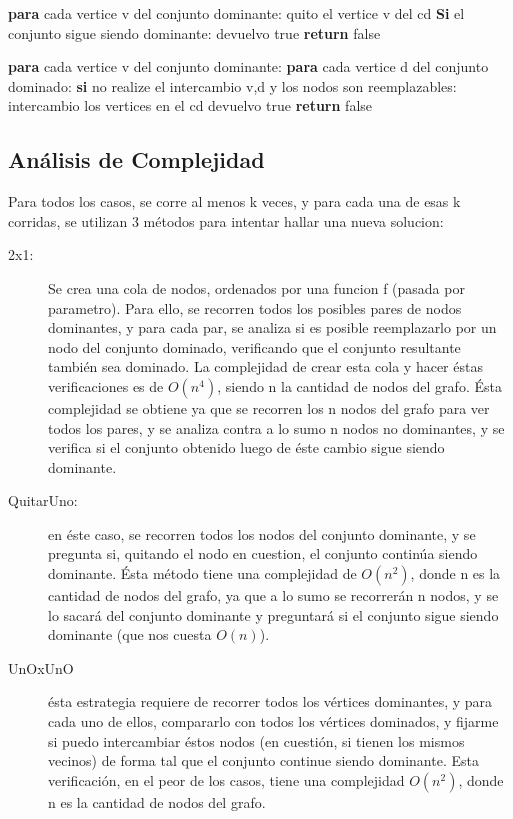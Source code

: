 \begin{codebox}
\li		\textbf{para} cada vertice v del conjunto dominante: \Do
\li			quito el vertice v del cd
\li			\textbf{Si} el conjunto sigue siendo dominante: \Do
\li				devuelvo true
\End
\End
\li \textbf{return} false
\end{codebox}

\begin{codebox}
\li		\textbf{para} cada vertice v del conjunto dominante: \Do
\li			\textbf{para} cada vertice d del conjunto dominado: \Do
\li				\textbf{si} no realize el intercambio v,d y los nodos son reemplazables: \Do
\li					intercambio los vertices en el cd
\li					devuelvo true
\End
\End
\End
\li \textbf{return} false
\end{codebox}

\subsection{Análisis de Complejidad}
Para todos los casos, se corre al menos k veces, y para cada una de esas k corridas, se utilizan 3 métodos para intentar hallar una nueva solucion:
\begin{description}
\item[2x1:] Se crea una cola de nodos, ordenados por una funcion f (pasada por parametro). Para ello, se recorren todos los posibles pares de nodos dominantes, y para cada par, se analiza si es posible reemplazarlo por un nodo del conjunto dominado, verificando que el conjunto resultante también sea dominado. La complejidad de crear esta cola y hacer éstas verificaciones es de $O(n^4)$, siendo n la cantidad de nodos del grafo. Ésta complejidad se obtiene ya que se recorren los n nodos del grafo para ver todos los pares, y se analiza contra a lo sumo n nodos no dominantes, y se verifica si el conjunto obtenido luego de éste cambio sigue siendo dominante.
\item[QuitarUno:] en éste caso, se recorren todos los nodos del conjunto dominante, y se pregunta si, quitando el nodo en cuestion, el conjunto continúa siendo dominante. Ésta método tiene una complejidad de $O(n^2)$, donde n es la cantidad de nodos del grafo, ya que a lo sumo se recorrerán n nodos, y se lo sacará del conjunto dominante y preguntará si el conjunto sigue siendo dominante (que nos cuesta $O(n)$).
 \item[UnOxUnO] ésta estrategia requiere de recorrer todos los vértices dominantes, y para cada uno de ellos, compararlo con todos los vértices dominados, y fijarme si puedo intercambiar éstos nodos (en cuestión, si tienen los mismos vecinos) de forma tal que el conjunto continue siendo dominante. Esta verificación, en el peor de los casos, tiene una complejidad $O(n^2)$, donde n es la cantidad de nodos del grafo.
\end{description}
 
